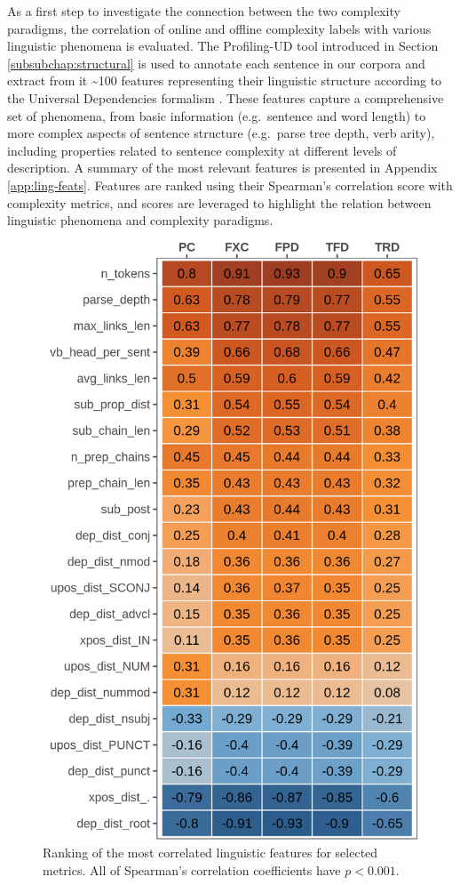 \documentclass[a4paper, nobind]{templates/ociamthesis}
\begin{document}
As a first step to investigate the connection between the two complexity paradigms, the correlation of online and offline complexity labels with various linguistic phenomena is evaluated. The Profiling-UD tool \autocite{brunato-etal-2020-profiling} introduced in Section \ref{subsubchap:structural} is used to annotate each sentence in our corpora and extract from it \textasciitilde{}100 features representing their linguistic structure according to the Universal Dependencies formalism \autocite{nivre-etal-2016-universal}. These features capture a comprehensive set of phenomena, from basic information (e.g.~sentence and word length) to more complex aspects of sentence structure (e.g.~parse tree depth, verb arity), including properties related to sentence complexity at different levels of description. A summary of the most relevant features is presented in Appendix \ref{app:ling-feats}. Features are ranked using their Spearman's correlation score with complexity metrics, and scores are leveraged to highlight the relation between linguistic phenomena and complexity paradigms.



\begin{figure}

{\centering \includegraphics[width=0.5\linewidth]{figures/3_feat_heatmap} 

}

\caption{Ranking of the most correlated linguistic features for selected metrics. All of Spearman's correlation coefficients have \(p<0.001\).}\label{fig:feat-heatmap}
\end{figure}
\end{document}
